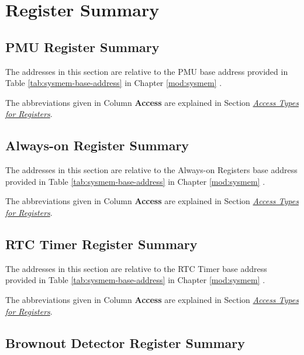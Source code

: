 \documentclass[main\_\_EN.tex]{subfiles}
\begin{document}
\clearpage
\section{Register Summary}\hypertarget{lowpowm-reg-summ}{}\label{sec:lowpowm-reg-summ}

\subsection{PMU Register Summary}

The addresses in this section are relative to the PMU base address provided in Table \ref{tab:sysmem-base-address} in Chapter \ref{mod:sysmem} \textit{}.

The abbreviations given in Column \textbf{Access} are explained in Section \hyperref[glossary-access-types]{\textit{Access Types for Registers}}.



\subsection{Always-on Register Summary}

The addresses in this section are relative to the Always-on Registers base address provided in Table \ref{tab:sysmem-base-address} in Chapter \ref{mod:sysmem} \textit{}.

The abbreviations given in Column \textbf{Access} are explained in Section \hyperref[glossary-access-types]{\textit{Access Types for Registers}}.



\subsection{RTC Timer Register Summary}

The addresses in this section are relative to the RTC Timer base address provided in Table \ref{tab:sysmem-base-address} in Chapter \ref{mod:sysmem} \textit{}.

The abbreviations given in Column \textbf{Access} are explained in Section \hyperref[glossary-access-types]{\textit{Access Types for Registers}}.



\subsection{Brownout Detector Register Summary}
\end{document}
